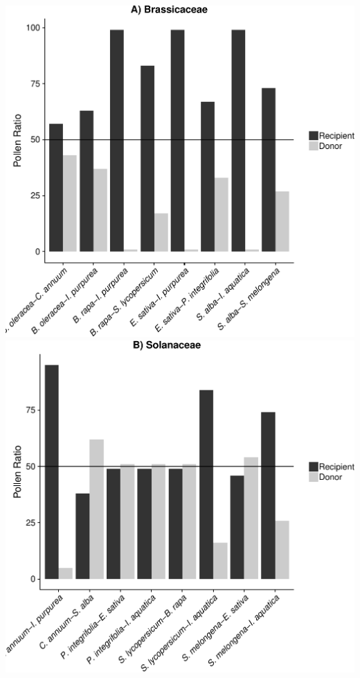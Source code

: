 \documentclass[11pt,a4paper]{article}
\begin{document}
\includegraphics{output/figures/unnamed-chunk-8-1.pdf}
\includegraphics{output/figures/unnamed-chunk-8-2.pdf}
\end{document}
